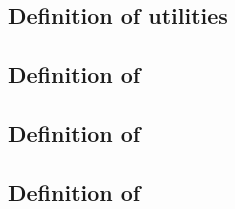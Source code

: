 \subsection{Definition of \wcpMod{} utilities                      \lispTodo{}}    \label{bls: utilities: wcp calls}                       
\subsection{Definition of \callToWellFormedCoordinatesBlsName{}    \lispTodo{}}    \label{bls: utilities: well formed fp coordinates}      
\subsection{Definition of \callToWellFormedCoordinatesBlsTwoName{} \lispTodo{}}    \label{bls: utilities: well formed fp2 coordinates}     
\subsection{Definition of \callToIsInfinityName{}                  \lispTodo{}}    \label{bls: utilities: call to is infinity}             
